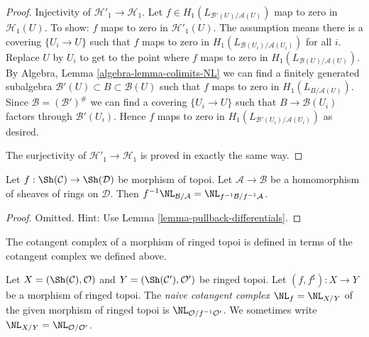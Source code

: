 \begin{proof}
\medskip\noindent
Injectivity of $\mathcal{H}'_1 \to \mathcal{H}_1$. Let
$f \in H_1(L_{\mathcal{B}'(U)/\mathcal{A}(U)})$ map to zero
in $\mathcal{H}_1(U)$. To show: $f$ maps to zero in
$\mathcal{H}'_1(U)$. The assumption means there is a covering
$\{U_i \to U\}$ such that $f$ maps to zero in
$H_1(L_{\mathcal{B}(U_i)/\mathcal{A}(U_i)})$ for all $i$.
Replace $U$ by $U_i$ to get to the point where $f$ maps to zero
in $H_1(L_{\mathcal{B}(U)/\mathcal{A}(U)})$.
By Algebra, Lemma \ref{algebra-lemma-colimits-NL}
we can find a finitely generated subalgebra
$\mathcal{B}'(U) \subset B \subset \mathcal{B}(U)$ such
that $f$ maps to zero in $H_1(L_{B/\mathcal{A}(U)})$.
Since $\mathcal{B} = (\mathcal{B}')^\#$ we can find a covering
$\{U_i \to U\}$ such that $B \to \mathcal{B}(U_i)$ factors
through $\mathcal{B}'(U_i)$. Hence $f$ maps to zero in
$H_1(L_{\mathcal{B}'(U_i)/\mathcal{A}(U_i)})$ as desired.

\medskip\noindent
The surjectivity of $\mathcal{H}'_1 \to \mathcal{H}_1$ is proved
in exactly the same way.
\end{proof}

\begin{lemma}
\label{lemma-pullback-NL}
Let $f : \Sh(\mathcal{C}) \to \Sh(\mathcal{D})$ be morphism of topoi.
Let $\mathcal{A} \to \mathcal{B}$ be a homomorphism of sheaves of rings
on $\mathcal{D}$. Then $f^{-1}\NL_{\mathcal{B}/\mathcal{A}} =
\NL_{f^{-1}\mathcal{B}/f^{-1}\mathcal{A}}$.
\end{lemma}

\begin{proof}
Omitted. Hint: Use Lemma \ref{lemma-pullback-differentials}.
\end{proof}

\noindent
The cotangent complex of a morphism of ringed topoi is defined
in terms of the cotangent complex we defined above.

\begin{definition}
\label{definition-cotangent-complex-morphism-ringed-topoi}
Let $X = (\Sh(\mathcal{C}), \mathcal{O})$ and
$Y = (\Sh(\mathcal{C}'), \mathcal{O}')$ be ringed topoi.
Let $(f, f^\sharp) : X \to Y$ be a morphism of ringed topoi.
The {\it naive cotangent complex} $\NL_f = \NL_{X/Y}$
of the given morphism of ringed topoi is
$\NL_{\mathcal{O}/f^{-1}\mathcal{O}'}$.
We sometimes write $\NL_{X/Y} = \NL_{\mathcal{O}/\mathcal{O}'}$.
\end{definition}









